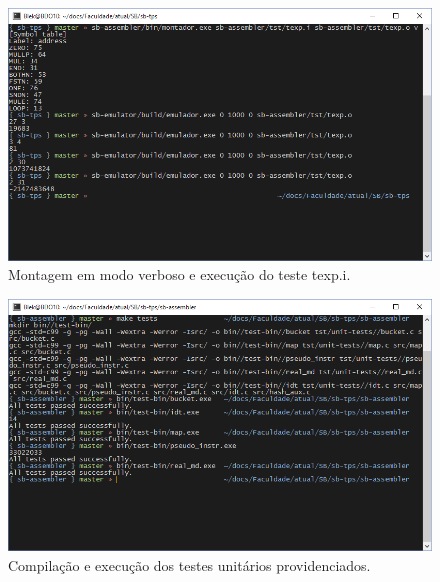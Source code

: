 \documentclass[10pt,a4paper]{article}
\numberwithin{equation}{section}
\begin{document}
\begin{figure}[h]
    \includegraphics[scale=0.7]{imagens/texp_console.png}
    \centering
    \caption{Montagem em modo verboso e execução do teste texp.i.}
\end{figure}

\begin{figure}[h]
    \includegraphics[scale=0.7]{imagens/unit_tests_console.png}
    \centering
    \caption{Compilação e execução dos testes unitários providenciados.}
\end{figure}

\FloatBarrier
\end{document}
